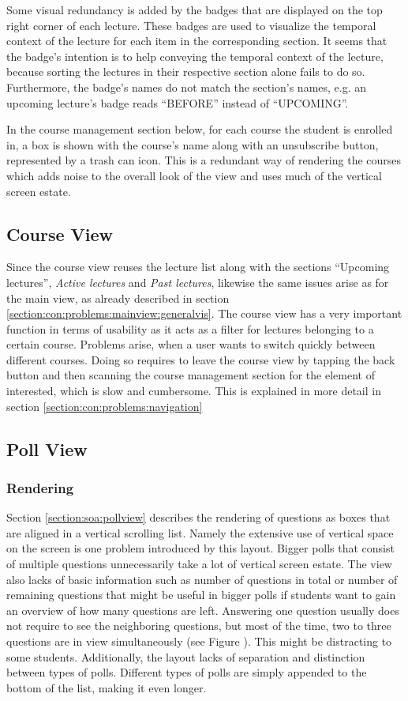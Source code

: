 Some visual redundancy is added by the badges that are displayed on the top right corner of each lecture. These badges are used to visualize the temporal context of the lecture for each item in the corresponding section. It seems that the badge's intention is to help conveying the temporal context of the lecture, because sorting the lectures in their respective section alone fails to do so. Furthermore, the badge's names do not match the section's names, e.g. an upcoming lecture's badge reads “BEFORE” instead of “UPCOMING”. 

In the course management section below, for each course the student is enrolled in, a box is shown with the course's name along with an unsubscribe button, represented by a trash can icon.
\todogrf
This is a redundant way of rendering the courses which adds noise to the overall look of the view and uses much of the vertical screen estate.

\subsection{Course View}

Since the course view reuses the lecture list along with the sections “Upcoming lectures”, \emph{Active lectures} and \emph{Past lectures}, likewise the same issues arise as for the main view, as already described in section \ref{section:con:problems:mainview:generalvis}. 
The course view has a very important function in terms of usability as it acts as a filter for lectures belonging to a certain course. Problems arise, when a user wants to switch quickly between different courses. Doing so requires to leave the course view by tapping the back button and then scanning the course management section for the element of interested, which is slow and cumbersome. This is explained in more detail in section \ref{section:con:problems:navigation}

\subsection{Poll View}

\subsubsection{Rendering}

Section \ref{section:soa:pollview} describes the rendering of questions as boxes that are aligned in a vertical scrolling list. Namely the extensive use of vertical space on the screen is one problem introduced by this layout. Bigger polls that consist of multiple questions unnecessarily take a lot of vertical screen estate. The view also lacks of basic information such as number of questions in total or number of remaining questions that might be useful in bigger polls if students want to gain an overview of how many questions are left.
Answering one question usually does not require to see the neighboring questions, but most of the time, two to three questions are in view simultaneously (see Figure \todosct). This might be distracting to some students.
\todogrf
Additionally, the layout lacks of separation and distinction between types of polls.
Different types of polls are simply appended to the bottom of the list, making it even longer.
\todogrf
